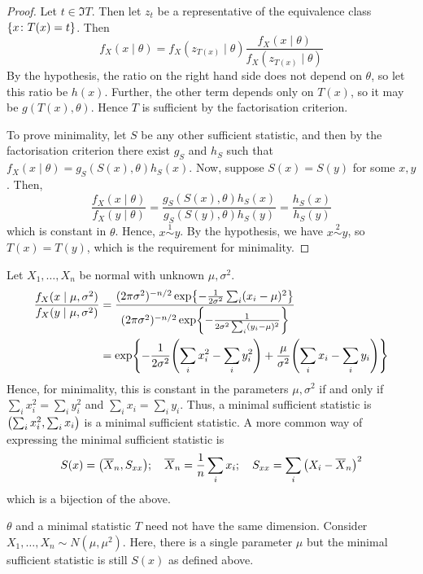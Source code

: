 \begin{proof}
	Let \( t \in \Im T \).
	Then let \( z_t \) be a representative of the equivalence class \( \qty{x \colon T(x) = t} \).
	Then
	\[ f_X(x \mid \theta) = f_X(z_{T(x)} \mid \theta) \frac{f_X(x \mid \theta)}{f_X(z_{T(x)} \mid \theta)} \]
	By the hypothesis, the ratio on the right hand side does not depend on \( \theta \), so let this ratio be \( h(x) \).
	Further, the other term depends only on \( T(x) \), so it may be \( g(T(x), \theta) \).
	Hence \( T \) is sufficient by the factorisation criterion.

	To prove minimality, let \( S \) be any other sufficient statistic, and then by the factorisation criterion there exist \( g_S \) and \( h_S \) such that \( f_X(x \mid \theta) = g_S(S(x), \theta) h_S(x) \).
	Now, suppose \( S(x) = S(y) \) for some \( x, y \).
	Then,
	\[ \frac{f_X(x \mid \theta)}{f_X(y \mid \theta)} = \frac{g_S(S(x), \theta) h_S(x)}{g_S(S(y), \theta) h_S(y)} = \frac{h_S(x)}{h_S(y)} \]
	which is constant in \( \theta \).
	Hence, \( x \overset{1}{\sim} y \).
	By the hypothesis, we have \( x \overset{2}{\sim} y \), so \( T(x) = T(y) \), which is the requirement for minimality.
\end{proof}
\begin{example}
	Let \( X_1, \dots, X_n \) be normal with unknown \( \mu, \sigma^2 \).
	\begin{align*}
		\frac{f_X(x \mid \mu, \sigma^2)}{f_X(y \mid \mu, \sigma^2)} &= \frac{(2 \pi \sigma^2)^{-n/2} \exp{-\frac{1}{2\sigma^2} \sum_i (x_i - \mu)^2}}{(2 \pi \sigma^2)^{-n/2} \exp{-\frac{1}{2\sigma^2 \sum_i (y_i - \mu)^2}}} \\
		&= \exp{-\frac{1}{2\sigma^2} \qty(\sum_i x_i^2 - \sum_i y_i^2) + \frac{\mu}{\sigma^2} \qty(\sum_i x_i - \sum_i y_i)}
	\end{align*}
	Hence, for minimality, this is constant in the parameters \( \mu, \sigma^2 \) if and only if \( \sum_i x_i^2 = \sum_i y_i^2 \) and \( \sum_i x_i = \sum_i y_i \).
	Thus, a minimal sufficient statistic is \( \qty(\sum_i x_i^2, \sum_i x_i) \) is a minimal sufficient statistic.
	A more common way of expressing the minimal sufficient statistic is
	\[ S(x) = \qty(\overline X_n, S_{xx});\quad \overline X_n = \frac{1}{n} \sum_i x_i;\quad S_{xx} = \sum_i \qty(X_i - \overline X_n)^2 \]
	which is a bijection of the above.
\end{example}
\begin{example}
	\( \theta \) and a minimal statistic \( T \) need not have the same dimension.
	Consider \( X_1, \dots, X_n \sim N(\mu, \mu^2) \).
	Here, there is a single parameter \( \mu \) but the minimal sufficient statistic is still \( S(x) \) as defined above.
\end{example}

